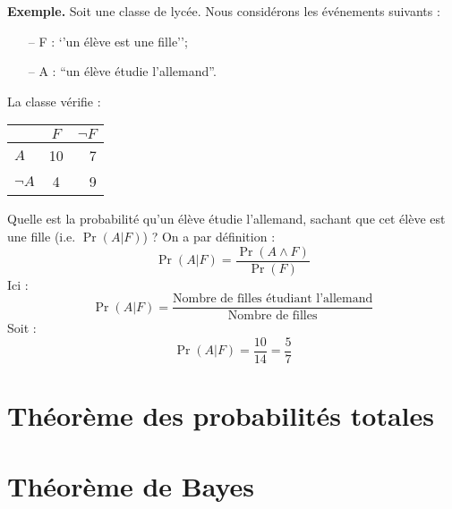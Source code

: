 \documentclass[11pt]{article} %
\begin{document}
\noindent
\textbf{Exemple.}
Soit une classe de lycée. Nous considérons les événements suivants :
\begin{itemize}
\item[--] F : `'un élève est une fille'';
\item[--] A : ``un élève étudie l'allemand''.
\end{itemize}

La classe vérifie :
\begin{center}
\begin{tabular}{|l|c|r|}
  \hline
   & $F$ & $\neg F$ \\
  \hline
  $A$ & 10 & 7 \\
  $\neg A$ & 4 & 9 \\
  \hline
\end{tabular}
\end{center}

Quelle est la probabilité qu'un élève étudie l'allemand, sachant que cet élève est une fille
(i.e. $\Pr(A|F)$) ?
On a par définition :
$$
\Pr(A|F) = \frac{\Pr(A \wedge F)}{\Pr(F)}
$$
Ici :
$$
\Pr(A|F)= \frac{\text{Nombre de filles étudiant l'allemand}}
			 {\text{Nombre de filles}}
$$
Soit :
$$
\Pr(A|F) = \frac{10}{14} = \frac{5}{7}
$$


\section{Théorème des probabilités totales}

\section{Théorème de Bayes}
\end{document}
